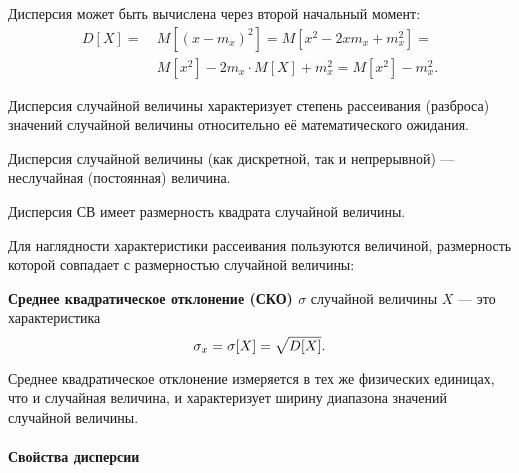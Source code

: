 \documentclass[a4paper]{article}
\newcommand{\sqrtt}[1]{\sqrt{\vphantom{qb} #1}}
\newcommand{\key}[1]{{\color{Medium}\bfseries #1}}
\begin{document}
                Дисперсия может быть вычислена через второй начальный момент:
                \begin{equation*}
                    \begin{aligned}
                        D[X] = ~& M[(x - m_x)^2] = M[x^2 - 2 x m_x + m_x^2] = \\[1.0ex]
                        & M[x^2] - 2 m_x \cdot M[X] + m_x^2 = M[x^2] - m_x^2 .
                    \end{aligned}
                \end{equation*}

                Дисперсия случайной величины характеризует степень рассеивания (разброса) значений случайной величины относительно её математического ожидания.
                
                Дисперсия случайной величины (как дискретной, так и непрерывной) --- неслучайная (постоянная) величина.
                
                Дисперсия СВ имеет размерность квадрата случайной величины.
                
                Для наглядности характеристики рассеивания пользуются величиной, размерность которой совпадает с размерностью случайной величины:

                \key{Среднее квадратическое отклонение (СКО) \boldmath$\sigma$} случайной величины $X$ --- это характеристика
                \begin{equation*}
                    \sigma_x = \sigma [X] = \sqrtt{D[X]} .
                \end{equation*}

                Среднее квадратическое отклонение измеряется в тех же физических единицах, что и случайная величина, и характеризует ширину диапазона значений случайной величины.

                \paragraph{Свойства дисперсии}
\end{document}
